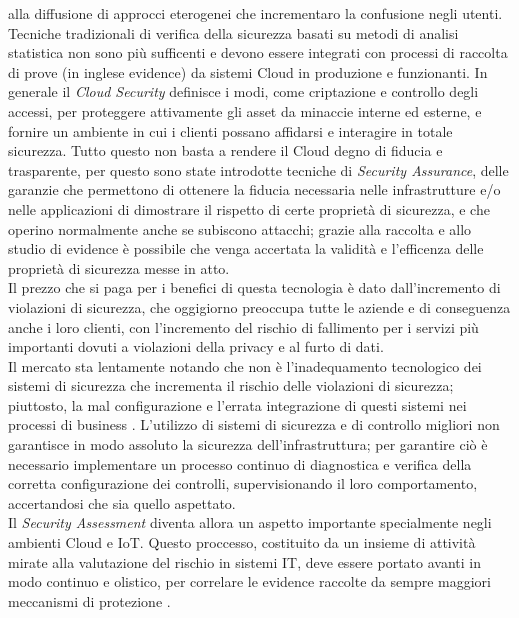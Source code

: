alla diffusione di approcci eterogenei che incrementaro la confusione negli utenti.
Tecniche tradizionali di verifica della sicurezza basati su metodi di analisi statistica non sono più sufficenti e devono essere integrati 
con processi di raccolta di prove (in inglese evidence) da sistemi Cloud in produzione e funzionanti. 
In generale il \textit{Cloud Security} definisce i modi, come criptazione e controllo degli accessi, per proteggere attivamente gli asset 
da minaccie interne ed esterne, e fornire un ambiente in cui i clienti possano affidarsi e interagire in totale sicurezza. 
Tutto questo non basta a rendere il Cloud degno di fiducia e trasparente, per questo sono state introdotte tecniche di
\textit{Security Assurance}, delle garanzie che permettono di ottenere la fiducia necessaria nelle infrastrutture e/o nelle 
applicazioni di dimostrare il rispetto di certe proprietà di sicurezza, e che operino normalmente anche se subiscono attacchi; grazie 
alla raccolta e allo studio di evidence è possibile che venga accertata la validità e l'efficenza delle proprietà di sicurezza messe in 
atto.
\ \\
Il prezzo che si paga per i benefici di questa tecnologia è dato dall'incremento di violazioni di sicurezza, che oggigiorno 
preoccupa tutte le aziende e di conseguenza anche i loro clienti, con l'incremento del rischio di fallimento per i servizi più importanti 
dovuti a violazioni della privacy e al furto di dati.\\
Il mercato sta lentamente notando che non è l'inadequamento tecnologico dei sistemi di sicurezza che incrementa il rischio delle 
violazioni di sicurezza; piuttosto, la mal configurazione e l'errata integrazione di questi sistemi nei processi di business 
\cite{cloud-Platform-for-ICT-Security-Governance}.
L'utilizzo di sistemi di sicurezza e di controllo migliori non garantisce in modo assoluto la sicurezza dell'infrastruttura; 
per garantire ciò è necessario implementare un processo continuo di diagnostica e verifica della corretta configurazione dei controlli, 
supervisionando il loro comportamento, accertandosi che sia quello aspettato.\\
Il \textit{Security Assessment} diventa allora un aspetto importante specialmente negli ambienti Cloud e IoT. Questo proccesso, costituito
da un insieme di attività mirate alla valutazione del rischio in sistemi IT, deve essere portato avanti in modo continuo e olistico, per 
correlare le evidence raccolte da sempre maggiori meccanismi di protezione \cite{mooncloud-semi-automatic-and-trustworthy}.\\
